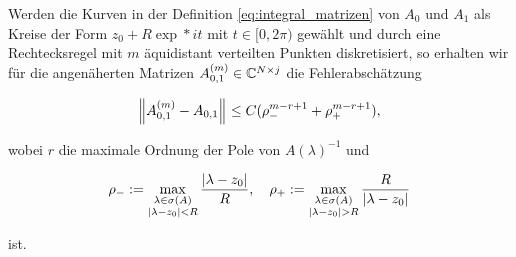 \begin{theorem} \label{thm:quadratur_konvergenz}

    Werden die Kurven in der Definition \eqref{eq:integral_matrizen} von $A_0$ und $A_1$ als Kreise der Form $z_0 + R \exp*{i t}$ mit $t \in [0, 2 \pi)$ gewählt und durch eine Rechtecksregel mit $m$ äquidistant verteilten Punkten diskretisiert, so erhalten wir für die angenäherten Matrizen $A_{0, 1}^{(m)} \in \mathbb{C}^{N \times j}$ die Fehlerabschätzung

    \begin{align*}
        {\left \| A_{0, 1}^{(m)} - A_{0, 1} \right \|}_{}
        \leq
        C (\rho_-^{m - r + 1} + \rho_+^{m - r + 1}),
    \end{align*}

    wobei $r$ die maximale Ordnung der Pole von $A(\lambda)^{-1}$ und

    \begin{align*}
        \rho_-
        :=
        \max_{\substack{\lambda \in \sigma(A) \\ {\left | \lambda - z_0 \right |} < R}}
            \frac{{\left | \lambda - z_0 \right |}}{R},
        \quad
        \rho_+
        :=
        \max_{\substack{\lambda \in \sigma(A) \\ {\left | \lambda - z_0 \right |} > R}}
            \frac{R}{{\left | \lambda - z_0 \right |}}
    \end{align*}

    ist.

\end{theorem}
